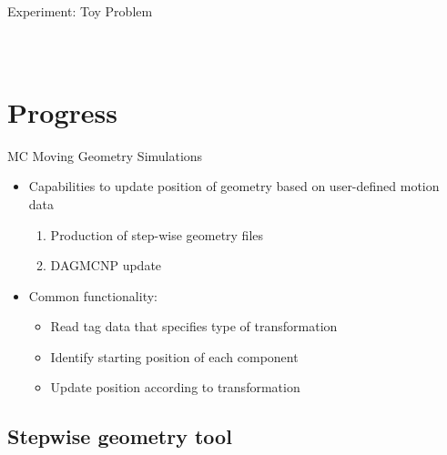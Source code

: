 \documentclass{beamer}
\begin{document}
\begin{frame}{Experiment: Toy Problem}
\begin{columns}
\begin{figure}
{\begin{tikzpicture}[every text node part/.style={align=center}]
	\end{tikzpicture}
        }
\end{figure}
\end{columns}
\end{frame}


\section{Progress}
\begin{frame}{MC Moving Geometry Simulations}
	\begin{itemize}
		\item{Capabilities to update position of geometry based on
			user-defined motion data}
			\begin{enumerate}
				\item{Production of step-wise geometry files}
				\item{DAGMCNP update}
			\end{enumerate}
		\item{Common functionality:}
			\begin{itemize}
				\item{%
					Read tag data that specifies 
					type of transformation}
				\item{Identify starting position of each
					component}
				\item{Update position according to
					transformation}
			\end{itemize}
	\end{itemize}
\end{frame}
\subsection{Stepwise geometry tool}
\end{document}
